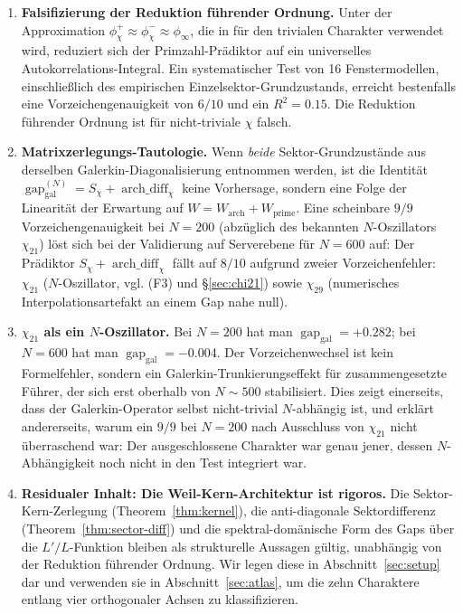 \documentclass[a4paper,10pt,twocolumn]{article}
\theoremstyle{definition}
\theoremstyle{remark}
\newcommand{\gap}{\operatorname{gap}}
\newcommand{\chifn}{\chi}
\newcommand{\archdiff}{\operatorname{arch\_diff}}
\begin{document}
\begin{enumerate}
\item[(F1)] \textbf{Falsifizierung der Reduktion führender Ordnung.}
  Unter der Approximation
  $\phi^+_{\chifn}\approx\phi^-_{\chifn}\approx\phi_\infty$, die in
  \cite{RH_II} für den trivialen Charakter verwendet wird, reduziert sich der Primzahl-Prädiktor
  auf ein universelles Autokorrelations-Integral. Ein systematischer Test
  von 16 Fenstermodellen, einschließlich des empirischen Einzelsektor-Grundzustands,
  erreicht bestenfalls eine Vorzeichengenauigkeit von $6/10$ und ein $R^2=0.15$.
  Die Reduktion führender Ordnung ist für nicht-triviale $\chi$ falsch.
\item[(F2)] \textbf{Matrixzerlegungs-Tautologie.}
  Wenn \emph{beide} Sektor-Grundzustände aus derselben
  Galerkin-Diagonalisierung entnommen werden, ist die Identität
  $\gap_{\mathrm{gal}}^{(N)} = S_{\chifn}+\archdiff_{\chifn}$
  keine Vorhersage, sondern eine Folge der Linearität der
  Erwartung auf $W=W_{\mathrm{arch}}+W_{\mathrm{prime}}$. Eine scheinbare
  $9/9$ Vorzeichengenauigkeit bei $N=200$ (abzüglich des bekannten $N$-Oszillators
  $\chi_{21}$) löst sich bei der Validierung auf Serverebene für $N=600$ auf: Der
  Prädiktor $S_{\chifn}+\archdiff_{\chifn}$ fällt auf $8/10$ aufgrund
  zweier Vorzeichenfehler: $\chi_{21}$ ($N$-Oszillator,
  vgl. (F3) und \S\ref{sec:chi21}) sowie $\chi_{29}$ (numerisches
  Interpolationsartefakt an einem Gap nahe null).
\item[(F3)] \textbf{$\chi_{21}$ als ein $N$-Oszillator.}
  Bei $N=200$ hat man $\gap_{\mathrm{gal}}=+0.282$; bei $N=600$ hat man
  $\gap_{\mathrm{gal}}=-0.004$. Der Vorzeichenwechsel ist kein Formelfehler,
  sondern ein Galerkin-Trunkierungseffekt für zusammengesetzte Führer, der sich erst
  oberhalb von $N\sim 500$ stabilisiert. Dies zeigt einerseits, dass der Galerkin-Operator
  selbst nicht-trivial $N$-abhängig ist, und erklärt andererseits, warum ein
  $9/9$ bei $N=200$ nach Ausschluss von $\chi_{21}$ nicht überraschend war:
  Der ausgeschlossene Charakter war genau jener, dessen $N$-Abhängigkeit noch nicht
  in den Test integriert war.
\item[(F4)] \textbf{Residualer Inhalt: Die Weil-Kern-Architektur ist
  rigoros.} Die Sektor-Kern-Zerlegung
  (Theorem~\ref{thm:kernel}), die anti-diagonale Sektordifferenz
  (Theorem~\ref{thm:sector-diff}) und die spektral-domänische Form des
  Gaps über die $L'/L$-Funktion bleiben als strukturelle Aussagen gültig,
  unabhängig von der Reduktion führender Ordnung. Wir legen diese in
  Abschnitt~\ref{sec:setup} dar und verwenden sie in Abschnitt~\ref{sec:atlas},
  um die zehn Charaktere entlang vier orthogonaler Achsen zu klassifizieren.
\end{enumerate}
\end{document}
